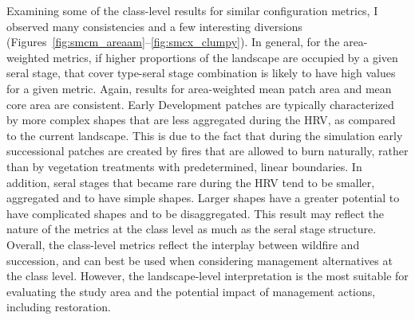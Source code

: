 Examining some of the class-level results for similar configuration metrics, I observed many consistencies and a few interesting diversions (Figures~\ref{fig:smcm_areaam}--\ref{fig:smcx_clumpy}). In general, for the area-weighted metrics, if higher proportions of the landscape are occupied by a given seral stage, that cover type-seral stage combination is likely to have high values for a given metric. Again, results for area-weighted mean patch area and mean core area are consistent. Early Development patches are typically characterized by more complex shapes that are less aggregated during the HRV, as compared to the current landscape. This is due to the fact that during the simulation early successional patches are created by fires that are allowed to burn naturally, rather than by vegetation treatments with predetermined, linear boundaries. In addition, seral stages that became rare during the HRV tend to be smaller, aggregated and to have simple shapes. Larger shapes have a greater potential to have complicated shapes and to be disaggregated. This result may reflect the nature of the metrics at the class level as much as the seral stage structure. Overall, the class-level metrics reflect the interplay between wildfire and succession, and can best be used when considering management alternatives at the class level. However, the landscape-level interpretation is the most suitable for evaluating the study area and the potential impact of management actions, including restoration. 

\clearpage


